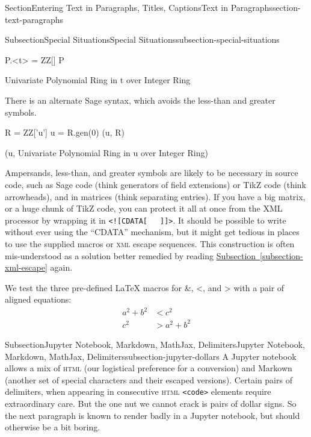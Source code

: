 \documentclass[twoside,10pt,]{article}
\newcommand{\xreffont}{\relax}
\newcommand{\mono}[1]{\texttt{#1}}
\newcommand{\initialism}[1]{\textsc{\MakeLowercase{#1}}}
\numberwithin{equation}{section}
\newcommand{\lt}{<}
\newcommand{\gt}{>}
\newcommand{\amp}{&}
\begin{document}
\begin{sectionptx}{Section}{Entering Text in Paragraphs, Titles, Captions}{}{Text in Paragraphs}{}{}{section-text-paragraphs}
\begin{subsectionptx}{Subsection}{Special Situations}{}{Special Situations}{}{}{subsection-special-situations}
\begin{sageinput}
P.<t> = ZZ[]
P
\end{sageinput}
\begin{sageoutput}
Univariate Polynomial Ring in t over Integer Ring
\end{sageoutput}
There is an alternate Sage syntax, which avoids the less-than and greater symbols.%
\begin{sageinput}
R = ZZ['u']
u = R.gen(0)
(u, R)
\end{sageinput}
\begin{sageoutput}
(u, Univariate Polynomial Ring in u over Integer Ring)
\end{sageoutput}
Ampersands, less-than, and greater symbols are likely to be necessary in source code, such as Sage code (think generators of field extensions) or TikZ code (think arrowheads), and in matrices (think separating entries).  If you have a big matrix, or a huge chunk of TikZ code, you can protect it all at once from the XML processor by wrapping it in \mono{<![CDATA[}~~~\mono{]]>}.  It should be possible to write without ever using the ``CDATA'' mechanism, but it might get tedious in places to use the supplied macros or \initialism{XML} escape sequences.  This construction is often mis-understood as a solution better remedied by reading \hyperref[subsection-xml-escape]{Subsection~{\xreffont\ref{subsection-xml-escape}}} again.%
\par
We test the three pre-defined \LaTeX{} macros for \&, \textless{}, and \textgreater{} with a pair of aligned equations:%
\begin{align*}
a^2 + b^2\amp\lt c^2\\
c^2\amp\gt a^2 + b^2
\end{align*}
%
\end{subsectionptx}
%
%
\typeout{************************************************}
\typeout{************************************************}
%
\begin{subsectionptx}{Subsection}{Jupyter Notebook, Markdown, MathJax, Delimiters}{}{Jupyter Notebook, Markdown, MathJax, Delimiters}{}{}{subsection-jupyter-dollars}
A Jupyter notebook allows a mix of \initialism{HTML} (our logistical preference for a conversion) and Markown (another set of special characters and their escaped versions).  Certain pairs of delimiters, when appearing in consecutive \initialism{HTML} \mono{<code>} elements require extraordinary care.  But the one nut we cannot crack is pairs of dollar signs.  So the next paragraph is known to render badly in a Jupyter notebook, but should otherwise be a bit boring.%

\end{subsectionptx}
\end{sectionptx}
\end{document}
